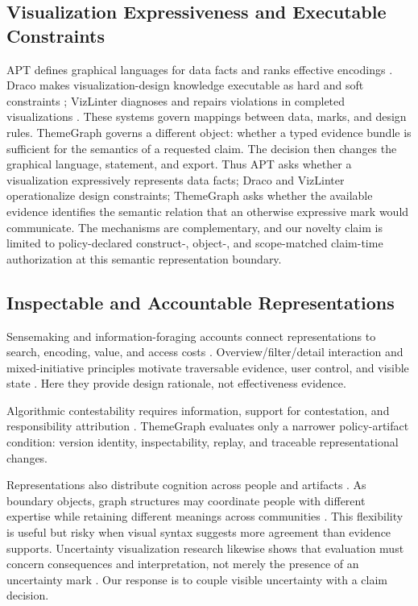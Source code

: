 \documentclass[manuscript,screen,review,anonymous]{acmart}
\begin{document}
\subsection{Visualization Expressiveness and Executable Constraints}

APT defines graphical languages for data facts and ranks effective encodings \cite{mackinlay1986}. Draco makes visualization-design knowledge executable as hard and soft constraints \cite{moritz2019}; VizLinter diagnoses and repairs violations in completed visualizations \cite{chen2022}. These systems govern mappings between data, marks, and design rules. ThemeGraph governs a different object: whether a typed evidence bundle is sufficient for the semantics of a requested claim. The decision then changes the graphical language, statement, and export. Thus APT asks whether a visualization expressively represents data facts; Draco and VizLinter operationalize design constraints; ThemeGraph asks whether the available evidence identifies the semantic relation that an otherwise expressive mark would communicate. The mechanisms are complementary, and our novelty claim is limited to policy-declared construct-, object-, and scope-matched claim-time authorization at this semantic representation boundary.

\subsection{Inspectable and Accountable Representations}

Sensemaking and information-foraging accounts connect representations to search, encoding, value, and access costs \cite{russell1993,pirolli1999}. Overview/filter/detail interaction and mixed-initiative principles motivate traversable evidence, user control, and visible state \cite{shneiderman1996,horvitz1999}. Here they provide design rationale, not effectiveness evidence.

Algorithmic contestability requires information, support for contestation, and responsibility attribution \cite{yurrita2025}. ThemeGraph evaluates only a narrower policy-artifact condition: version identity, inspectability, replay, and traceable representational changes.

Representations also distribute cognition across people and artifacts \cite{hutchins1995}. As boundary objects, graph structures may coordinate people with different expertise while retaining different meanings across communities \cite{star1989}. This flexibility is useful but risky when visual syntax suggests more agreement than evidence supports. Uncertainty visualization research likewise shows that evaluation must concern consequences and interpretation, not merely the presence of an uncertainty mark \cite{hullman2019}. Our response is to couple visible uncertainty with a claim decision.
\end{document}
